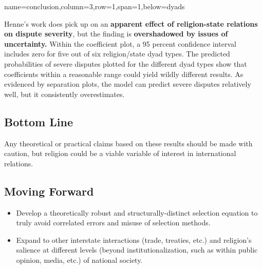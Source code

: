 \documentclass[landscape,paperheight=24in,fontscale=.45,paperwidth=36in,landscape,final]{baposter}
\begin{document}
\begin{poster}
{name=conclusion,column=3,row=1,span=1,below=dyads}
{
Henne's work does pick up on an \textbf{apparent effect of religion-state relations on dispute severity}, but the finding is \textbf{overshadowed by issues of uncertainty.} Within the coefficient plot, a 95 percent confidence interval includes zero for five out of six religion/state dyad types. The predicted probabilities of severe disputes plotted for the different dyad types show that coefficients within a reasonable range could yield wildly different results. As evidenced by separation plots, the model can predict severe disputes relatively well, but it consistently overestimates.
\vspace{-2mm}
\subsection*{Bottom Line}
\vspace{-1mm}
Any theoretical or practical claims based on these results should be made with caution, but religion could be a viable variable of interest in international relations.
\vspace{-2mm}
\subsection*{Moving Forward}
\vspace{-2mm}
\begin{itemize}
\item Develop a theoretically robust and structurally-distinct selection equation to truly avoid correlated errors and misuse of selection methods.
\item Expand to other interstate interactions (trade, treaties, etc.) and religion's salience at different levels (beyond institutionalization, such as within public opinion, media, etc.) of national society.
\end{itemize}
}



\end{poster}
\end{document}
